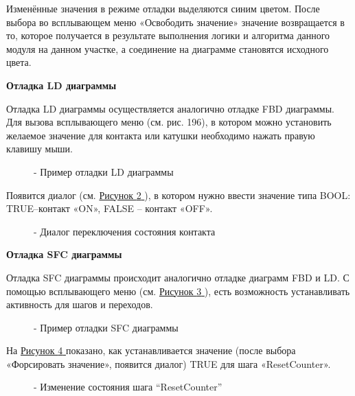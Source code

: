 \documentclass[letterpaper,10pt,russian]{sphinxmanual}
\begin{document}
Изменённые значения в режиме отладки выделяются синим цветом. После
выбора во всплывающем меню «Освободить значение» значение возвращается в
то, которое получается в результате выполнения логики и алгоритма
данного модуля на данном участке, а соединение на диаграмме становятся
исходного цвета.

\textbf{Отладка LD диаграммы}

Отладка LD диаграммы осуществляется аналогично отладке FBD диаграммы.
Для вызова всплывающего меню (см. рис. 196), в котором можно установить
желаемое значение для контакта или катушки необходимо нажать правую
клавишу мыши.
\begin{figure}[htbp]
\centering
\capstart

\noindent{}
\caption{- Пример отладки LD диаграммы}\label{usage_guide/work_with_project:image223}\end{figure}

Появится диалог (см. \hyperref[usage_guide/work_with_project:image224]{Рисунок \ref{usage_guide/work_with_project:image224} }), в котором нужно ввести значение типа
BOOL: TRUE–контакт «ON», FALSE – контакт «OFF».
\begin{figure}[htbp]
\centering
\capstart

\noindent{}
\caption{- Диалог переключения состояния контакта}\label{usage_guide/work_with_project:image224}\end{figure}

\textbf{Отладка SFC диаграммы}

Отладка SFC диаграммы происходит аналогично отладке диаграмм FBD и LD. С
помощью всплывающего меню (см. \hyperref[usage_guide/work_with_project:image225]{Рисунок \ref{usage_guide/work_with_project:image225} }), есть возможность устанавливать
активность для шагов и переходов.
\begin{figure}[htbp]
\centering
\capstart

\noindent{}
\caption{- Пример отладки SFC диаграммы}\label{usage_guide/work_with_project:image225}\end{figure}

На \hyperref[usage_guide/work_with_project:image226]{Рисунок \ref{usage_guide/work_with_project:image226} } показано, как устанавливается значение (после выбора
«Форсировать значение», появится диалог) TRUE для шага «ResetCounter».
\begin{figure}[htbp]
\centering
\capstart

\noindent{}
\caption{- Изменение состояния шага ``ResetCounter''}\label{usage_guide/work_with_project:image226}\end{figure}
\end{document}
